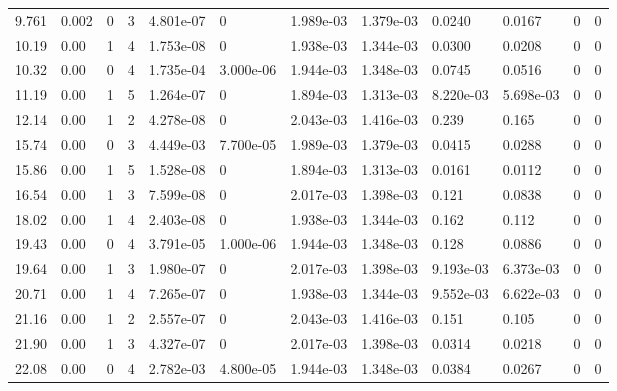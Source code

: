 \documentclass[preview]{standalone}
\begin{document}
{{\begin{tabular}{L{1.2cm}C{1.2cm} C{0.3cm}C{0.5cm} C{1.4cm}C{1.4cm} C{1.4cm}C{1.4cm} C{1.6cm}C{1.6cm} C{1.6cm}C{1.6cm}}
  9.761  &  0.002  & 0     &  3 &  4.801e-07  & 0  &  1.989e-03&   1.379e-03& 0.0240 & 0.0167   &  0 & 0  \\ 
  10.19  &  0.00  & 1     &  4 &  1.753e-08  & 0  &  1.938e-03&   1.344e-03& 0.0300 & 0.0208   &  0 & 0  \\ 
  10.32  &  0.00  & 0     &  4 &  1.735e-04  & 3.000e-06  &  1.944e-03&   1.348e-03& 0.0745 & 0.0516   &  0 & 0  \\ 
  11.19  &  0.00  & 1     &  5 &  1.264e-07  & 0  &  1.894e-03&   1.313e-03& 8.220e-03 & 5.698e-03   &  0 & 0  \\ 
  12.14  &  0.00  & 1     &  2 &  4.278e-08  & 0  &  2.043e-03&   1.416e-03& 0.239 & 0.165   &  0 & 0  \\ 
  15.74  &  0.00  & 0     &  3 &  4.449e-03  & 7.700e-05  &  1.989e-03&   1.379e-03& 0.0415 & 0.0288   &  0 & 0  \\ 
  15.86  &  0.00  & 1     &  5 &  1.528e-08  & 0  &  1.894e-03&   1.313e-03& 0.0161 & 0.0112   &  0 & 0  \\ 
  16.54  &  0.00  & 1     &  3 &  7.599e-08  & 0  &  2.017e-03&   1.398e-03& 0.121 & 0.0838   &  0 & 0  \\ 
  18.02  &  0.00  & 1     &  4 &  2.403e-08  & 0  &  1.938e-03&   1.344e-03& 0.162 & 0.112   &  0 & 0  \\ 
  19.43  &  0.00  & 0     &  4 &  3.791e-05  & 1.000e-06  &  1.944e-03&   1.348e-03& 0.128 & 0.0886   &  0 & 0  \\ 
  19.64  &  0.00  & 1     &  3 &  1.980e-07  & 0  &  2.017e-03&   1.398e-03& 9.193e-03 & 6.373e-03   &  0 & 0  \\ 
  20.71  &  0.00  & 1     &  4 &  7.265e-07  & 0  &  1.938e-03&   1.344e-03& 9.552e-03 & 6.622e-03   &  0 & 0  \\ 
  21.16  &  0.00  & 1     &  2 &  2.557e-07  & 0  &  2.043e-03&   1.416e-03& 0.151 & 0.105   &  0 & 0  \\ 
  21.90  &  0.00  & 1     &  3 &  4.327e-07  & 0  &  2.017e-03&   1.398e-03& 0.0314 & 0.0218   &  0 & 0  \\ 
  22.08  &  0.00  & 0     &  4 &  2.782e-03  & 4.800e-05  &  1.944e-03&   1.348e-03& 0.0384 & 0.0267   &  0 & 0  \\ 
\hline 
\end{tabular} 

}}
\end{document}
